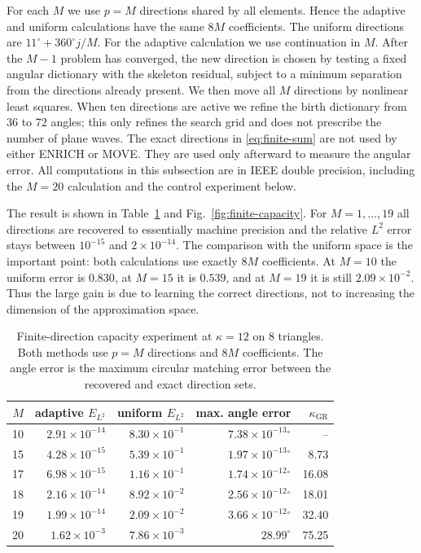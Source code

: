 \documentclass[pdflatex,sn-mathphys-num]{sn-jnl}
\theoremstyle{thmstyleone}
\theoremstyle{thmstyletwo}
\newcommand{\GR}{\mathrm{GR}}
\begin{document}
For each $M$ we use $p=M$ directions shared by all elements.  Hence the adaptive and uniform calculations have the same $8M$ coefficients.  The uniform directions are $11^\circ+360^\circ j/M$.  For the adaptive calculation we use continuation in $M$.  After the $M-1$ problem has converged, the new direction is chosen by testing a fixed angular dictionary with the skeleton residual, subject to a minimum separation from the directions already present.  We then move all $M$ directions by nonlinear least squares.  When ten directions are active we refine the birth dictionary from 36 to 72 angles; this only refines the search grid and does not prescribe the number of plane waves.  The exact directions in \eqref{eq:finite-sum} are not used by either ENRICH or MOVE.  They are used only afterward to measure the angular error.  All computations in this subsection are in IEEE double precision, including the $M=20$ calculation and the control experiment below.

The result is shown in Table~\ref{tab:finite-capacity} and Fig.~\ref{fig:finite-capacity}.  For $M=1,\ldots,19$ all directions are recovered to essentially machine precision and the relative $L^2$ error stays between $10^{-15}$ and $2\times10^{-14}$.  The comparison with the uniform space is the important point: both calculations use exactly $8M$ coefficients.  At $M=10$ the uniform error is $0.830$, at $M=15$ it is $0.539$, and at $M=19$ it is still $2.09\times10^{-2}$.  Thus the large gain is due to learning the correct directions, not to increasing the dimension of the approximation space.

\begin{table}[htbp]
\centering
\caption{Finite-direction capacity experiment at $\kappa=12$ on 8 triangles.  Both methods use $p=M$ directions and $8M$ coefficients.  The angle error is the maximum circular matching error between the recovered and exact direction sets.}
\label{tab:finite-capacity}
\begin{tabular}{|r|r|r|r|r|}
\hline
$M$ & adaptive $E_{L^2}$ & uniform $E_{L^2}$ & max. angle error & $\kappa_{\GR}$\\
\hline
10 & $2.91\times10^{-14}$ & $8.30\times10^{-1}$ & $7.38\times10^{-13}\!{}^\circ$ & --\\
15 & $4.28\times10^{-15}$ & $5.39\times10^{-1}$ & $1.97\times10^{-13}\!{}^\circ$ & 8.73\\
17 & $6.98\times10^{-15}$ & $1.16\times10^{-1}$ & $1.74\times10^{-12}\!{}^\circ$ & 16.08\\
18 & $2.16\times10^{-14}$ & $8.92\times10^{-2}$ & $2.56\times10^{-12}\!{}^\circ$ & 18.01\\
19 & $1.99\times10^{-14}$ & $2.09\times10^{-2}$ & $3.66\times10^{-12}\!{}^\circ$ & 32.40\\
20 & $1.62\times10^{-3}$  & $7.86\times10^{-3}$ & $28.99^\circ$ & 75.25\\
\hline
\end{tabular}
\end{table}
\end{document}
